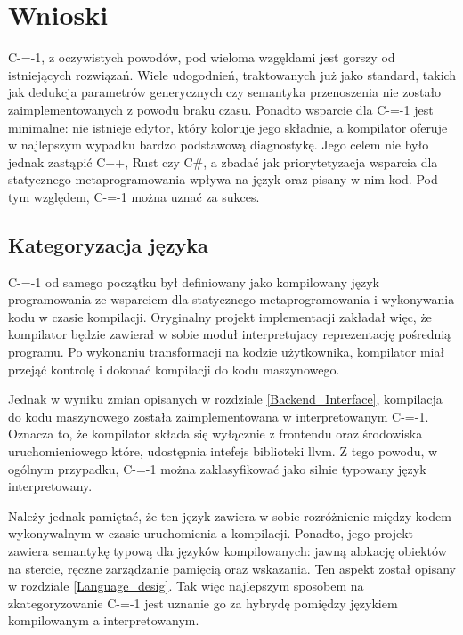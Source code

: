 \section{Wnioski}

C-=-1, z oczywistych powodów, pod wieloma wzgęldami jest gorszy od istniejących rozwiązań.
Wiele udogodnień, traktowanych już jako standard, takich jak dedukcja parametrów generycznych czy semantyka przenoszenia nie zostało zaimplementowanych z powodu braku czasu.
Ponadto wsparcie dla C-=-1 jest minimalne: nie istnieje edytor, który koloruje jego składnie, a kompilator oferuje w najlepszym wypadku bardzo podstawową diagnostykę.
Jego celem nie było jednak zastąpić C++, Rust czy C\#, a zbadać jak priorytetyzacja wsparcia dla statycznego metaprogramowania wpływa na język oraz pisany w nim kod. 
Pod tym względem, C-=-1 można uznać za sukces.



\subsection{Kategoryzacja języka}

C-=-1 od samego początku był definiowany jako kompilowany język programowania ze wsparciem dla statycznego metaprogramowania i wykonywania kodu w czasie kompilacji.
Oryginalny projekt implementacji zakładał więc, że kompilator będzie zawierał w sobie moduł interpretujacy reprezentację pośrednią programu.
Po wykonaniu transformacji na kodzie użytkownika, kompilator miał przejąć kontrolę i dokonać kompilacji do kodu maszynowego.

Jednak w wyniku zmian opisanych w rozdziale \ref{Backend_Interface}, kompilacja do kodu maszynowego została zaimplementowana w interpretowanym C-=-1.
Oznacza to, że kompilator składa się wyłącznie z frontendu oraz środowiska uruchomieniowego które, udostępnia intefejs biblioteki llvm.
Z tego powodu, w ogólnym przypadku, C-=-1 można zaklasyfikować jako silnie typowany język interpretowany.

Należy jednak pamiętać, że ten język zawiera w sobie rozróżnienie między kodem wykonywalnym w czasie uruchomienia a kompilacji.
Ponadto, jego projekt zawiera semantykę typową dla języków kompilowanych: jawną alokację obiektów na stercie, ręczne zarządzanie pamięcią oraz wskazania. 
Ten aspekt został opisany w rozdziale \ref{Language_desig}.
Tak więc najlepszym sposobem na zkategoryzowanie C-=-1 jest uznanie go za hybrydę pomiędzy językiem kompilowanym a interpretowanym.


